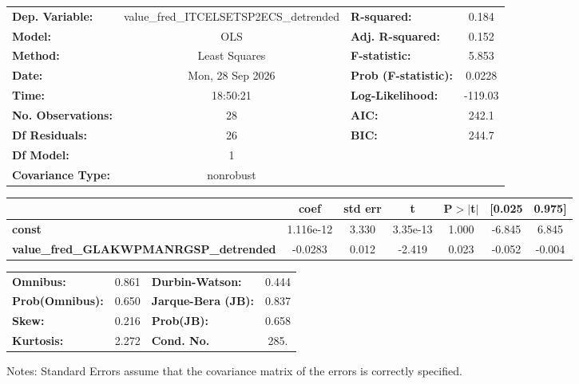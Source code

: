 \begin{center}
\begin{tabular}{lclc}
\toprule
\textbf{Dep. Variable:}                        & value\_fred\_ITCELSETSP2ECS\_detrended & \textbf{  R-squared:         } &     0.184   \\
\textbf{Model:}                                &                  OLS                   & \textbf{  Adj. R-squared:    } &     0.152   \\
\textbf{Method:}                               &             Least Squares              & \textbf{  F-statistic:       } &     5.853   \\
\textbf{Date:}                                 &            Mon, 28 Sep 2026            & \textbf{  Prob (F-statistic):} &   0.0228    \\
\textbf{Time:}                                 &                18:50:21                & \textbf{  Log-Likelihood:    } &   -119.03   \\
\textbf{No. Observations:}                     &                     28                 & \textbf{  AIC:               } &     242.1   \\
\textbf{Df Residuals:}                         &                     26                 & \textbf{  BIC:               } &     244.7   \\
\textbf{Df Model:}                             &                      1                 & \textbf{                     } &             \\
\textbf{Covariance Type:}                      &               nonrobust                & \textbf{                     } &             \\
\bottomrule
\end{tabular}
\begin{tabular}{lcccccc}
                                               & \textbf{coef} & \textbf{std err} & \textbf{t} & \textbf{P$> |$t$|$} & \textbf{[0.025} & \textbf{0.975]}  \\
\midrule
\textbf{const}                                 &    1.116e-12  &        3.330     &  3.35e-13  &         1.000        &       -6.845    &        6.845     \\
\textbf{value\_fred\_GLAKWPMANRGSP\_detrended} &      -0.0283  &        0.012     &    -2.419  &         0.023        &       -0.052    &       -0.004     \\
\bottomrule
\end{tabular}
\begin{tabular}{lclc}
\textbf{Omnibus:}       &  0.861 & \textbf{  Durbin-Watson:     } &    0.444  \\
\textbf{Prob(Omnibus):} &  0.650 & \textbf{  Jarque-Bera (JB):  } &    0.837  \\
\textbf{Skew:}          &  0.216 & \textbf{  Prob(JB):          } &    0.658  \\
\textbf{Kurtosis:}      &  2.272 & \textbf{  Cond. No.          } &     285.  \\
\bottomrule
\end{tabular}
\end{center}

Notes: \newline
 [1] Standard Errors assume that the covariance matrix of the errors is correctly specified.